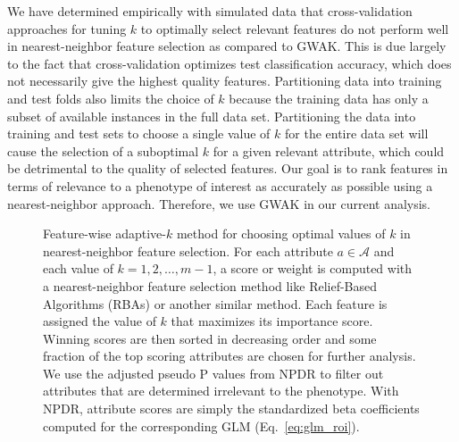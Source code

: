 \documentclass[10pt,letterpaper]{article}\usepackage[]{graphicx}\usepackage[]{color}
\begin{document}
We have determined empirically with simulated data that cross-validation approaches for tuning $k$ to optimally select relevant features do not perform well in nearest-neighbor feature selection as compared to GWAK. This is due largely to the fact that cross-validation optimizes test classification accuracy, which does not necessarily give the highest quality features. Partitioning data into training and test folds also limits the choice of $k$ because the training data has only a subset of available instances in the full data set. Partitioning the data into training and test sets to choose a single value of $k$ for the entire data set will cause the selection of a suboptimal $k$ for a given relevant attribute, which could be detrimental to the quality of selected features. Our goal is to rank features in terms of relevance to a phenotype of interest as accurately as possible using a nearest-neighbor approach. Therefore, we use GWAK in our current analysis.

\begin{figure}[h!]
	\centering
	\caption{Feature-wise adaptive-$k$ method for choosing optimal values of $k$ in nearest-neighbor feature selection. For each attribute $a \in \mathcal{A}$ and each value of $k=1,2,\dots,m-1$, a score or weight is computed with a nearest-neighbor feature selection method like Relief-Based Algorithms (RBAs) or another similar method. Each feature is assigned the value of $k$ that maximizes its importance score. Winning scores are then sorted in decreasing order and some fraction of the top scoring attributes are chosen for further analysis. We use the adjusted pseudo P values from NPDR to filter out attributes that are determined irrelevant to the phenotype. With NPDR, attribute scores are simply the standardized beta coefficients computed for the corresponding GLM (Eq.~\ref{eq:glm_roi}).}\label{fig:gwak}
\end{figure}
\end{document}
